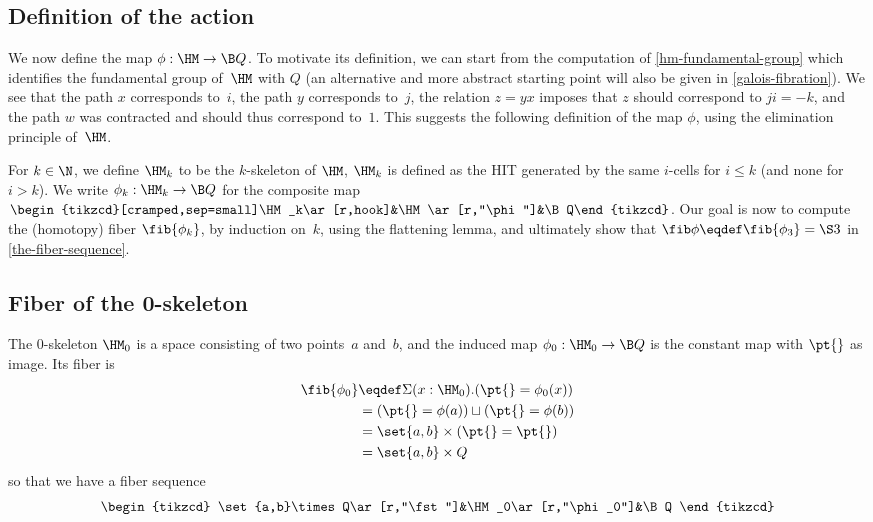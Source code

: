 \documentclass[a4paper]{article}
\begin{document}
\subsection{Definition of the action}
We now define the map $\phi:\HM\to\B Q$. To motivate its definition, we can start from the computation of \cref{hm-fundamental-group} which identifies the fundamental group of~$\HM$ with $Q$ (an alternative and more abstract starting point will also be given in \cref{galois-fibration}). We see that the path $x$ corresponds to~$i$, the path $y$ corresponds to~$j$, the relation $z=yx$ imposes that $z$ should correspond to $ji=-k$, and the path $w$ was contracted and should thus correspond to~$1$. This suggests the following definition of the map $\phi$, using the elimination principle of~$\HM$.


For $k\in\N$, we define $\HM_k$ to be the $k$-skeleton of $\HM$, \ie $\HM_k$ is defined as the HIT generated by the same $i$-cells for $i\leq k$ (and none for $i>k$). We write $\phi_k:\HM_k\to\B Q$ for the composite map $\begin{tikzcd}[cramped,sep=small]\HM_k\ar[r,hook]&\HM\ar[r,"\phi"]&\B Q\end{tikzcd}$.
%
Our goal is now to compute the (homotopy) fiber $\fib{\phi_k}$, by induction on~$k$, using the flattening lemma, and ultimately show that $\fib\phi\eqdef\fib{\phi_3}=\S3$ in \cref{the-fiber-sequence}.

\subsection{Fiber of the 0-skeleton}
The 0-skeleton $\HM_0$ is a space consisting of two points~$a$ and~$b$, and the induced map $\phi_0:\HM_0\to\B Q$ is the constant map with $\pt{}$ as image. Its fiber is
\begin{align*}
  \fib{\phi_0}
  &\eqdef
  \Sigma(x:\HM_0).(\pt{}=\phi_0(x))
  \\
  &=
  (\pt{}=\phi(a))
  \sqcup
  (\pt{}=\phi(b))
  \\
  &=
  \set{a,b}\times(\pt{}=\pt{})
  \\
  &=
  \set{a,b}\times Q  
\end{align*}
so that we have a fiber sequence
\[
  \begin{tikzcd}
    \set{a,b}\times Q\ar[r,"\fst"]&\HM_0\ar[r,"\phi_0"]&\B Q
  \end{tikzcd}
\]
\end{document}
